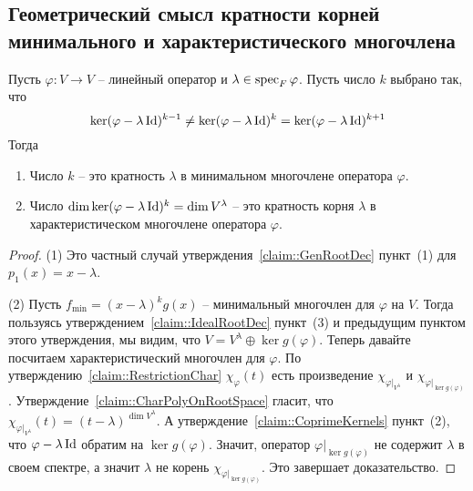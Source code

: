 \subsection{Геометрический смысл кратности корней минимального и характеристического многочлена}

\begin{claim}
\label{claim::RootMultGeom}
Пусть $\varphi\colon V \to V$ -- линейный оператор и $\lambda \in \operatorname{spec}_F \varphi$.
Пусть число $k$ выбрано так, что
\[
\ker (\varphi-\lambda\operatorname{Id})^{k-1} \neq \ker (\varphi-\lambda\operatorname{Id})^k = \ker (\varphi-\lambda\operatorname{Id})^{k+1}
\]
Тогда
\begin{enumerate}
\item Число $k$ -- это кратность $\lambda$ в минимальном многочлене оператора $\varphi$.

\item Число $\dim \ker(\varphi - \lambda \operatorname{Id})^k = \dim V^\lambda$ -- это кратность корня $\lambda$ в характеристическом многочлене оператора $\varphi$.
\end{enumerate}
\end{claim}
\begin{proof}
(1) Это частный случай утверждения~\ref{claim::GenRootDec} пункт~(1) для $p_1(x) = x-\lambda$.

(2) Пусть $f_\text{min} = (x-\lambda)^k g(x)$ -- минимальный многочлен для $\varphi$ на $V$.
Тогда пользуясь утверждением~\ref{claim::IdealRootDec} пункт~(3) и предыдущим пунктом этого утверждения, мы видим, что $V = V^\lambda \oplus \ker g(\varphi)$.
Теперь давайте посчитаем характеристический многочлен для $\varphi$.
По утверждению~\ref{claim::RestrictionChar} $\chi_\varphi(t)$ есть произведение $\chi_{\varphi|_{V^\lambda}}$ и $\chi_{\varphi|_{\ker g(\varphi)}}$.
Утверждение~\ref{claim::CharPolyOnRootSpace} гласит, что $\chi_{\varphi|_{V^\lambda}}(t) = (t - \lambda)^{\dim V^\lambda}$.
А утверждение~\ref{claim::CoprimeKernels} пункт~(2), что $\varphi - \lambda\operatorname{Id}$ обратим на $\ker g(\varphi)$.
Значит, оператор $\varphi|_{\ker g(\varphi)}$ не содержит $\lambda$ в своем спектре, а значит $\lambda$ не корень $\chi_{\varphi|_{\ker g(\varphi)}}$.
Это завершает доказательство.
\end{proof}
